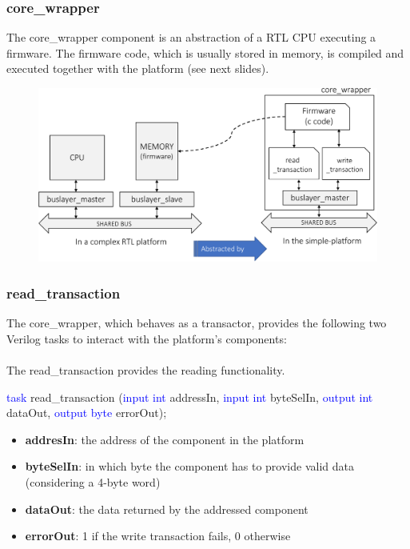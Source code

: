 \documentclass{beamer}
\begin{document}
\begin{frame}

\frametitle{core\_wrapper}
The core\_wrapper component is an abstraction of a RTL CPU executing a firmware.
The firmware code, which is usually stored in memory, is compiled and executed together
with the platform (see next slides).

\begin{figure}
	\centering
	\includegraphics[width=0.9\columnwidth]{figures/cpu_abstraction-crop.pdf}
\end{figure}
\end{frame}


\begin{frame}

\frametitle{read\_transaction}
The core\_wrapper, which behaves as a transactor, provides the following two Verilog
tasks to interact with the platform's components:\\~\\

The read\_transaction provides the reading functionality.
\begin{block}{}
	\textcolor{blue}{task} read\_transaction
	(\textcolor{blue}{input int} addressIn, \textcolor{blue}{input int} byteSelIn, 
	\textcolor{blue}{output int} dataOut, \textcolor{blue}{output byte} errorOut);
\end{block}

\begin{itemize}
	\item \textbf{addresIn}: the address of the component in the platform
	\item \textbf{byteSelIn}: in which byte the component has to provide valid
	                          data  (considering a 4-byte word)
	\item \textbf{dataOut}: the data returned by the addressed component
	\item \textbf{errorOut}: 1 if the write transaction fails, 0 otherwise
\end{itemize}

\end{frame}
\end{document}
